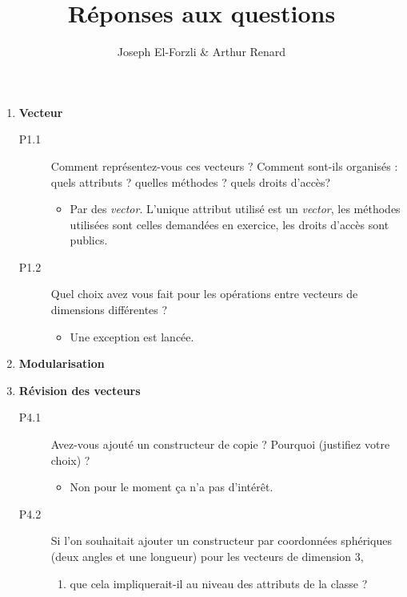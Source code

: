\documentclass[a4paper]{article}
\begin{document}
\author{Joseph El-Forzli & Arthur Renard}
\date{}
\title{Réponses aux questions}
\maketitle

	\begin{enumerate} 
		\item \textbf{Vecteur}
		
		\begin{description}
			\item[P1.1] Comment représentez-vous ces vecteurs ? Comment sont-ils organisés : quels attributs ? quelles méthodes ? quels droits d'accès?
			
			\begin{itemize} 
				\item Par des \emph{vector}. L'unique attribut utilisé est un \emph{vector}, les méthodes utilisées sont celles demandées en exercice, les droits d'accès sont publics. 
			\end{itemize}
			
			\item	[P1.2] Quel choix avez vous fait pour les opérations entre vecteurs de dimensions différentes ?			
			
			\begin{itemize} 
				\item Une exception est lancée.
			\end{itemize}
		\end{description}
		
		\item \textbf{Modularisation} 
		\\
		\item \textbf{Révision des vecteurs}
		
			\begin{description}
				\item[P4.1]  Avez-vous ajouté un constructeur de copie ? Pourquoi (justifiez votre choix) ?
				
				\begin {itemize}
					\item Non pour le moment ça n'a pas d'intérêt.
				\end {itemize}
				
				\item[P4.2]  Si l'on souhaitait ajouter un constructeur par coordonnées sphériques (deux angles et une longueur) pour les vecteurs de dimension 3,
				
				\begin{enumerate}
				\item que cela impliquerait-il au niveau des attributs de la classe ?
				

\end{enumerate}
\end{description}
\end{enumerate}
\end{document}
